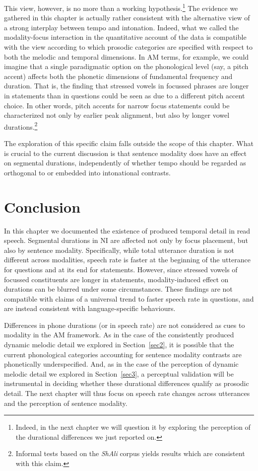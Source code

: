 This view, however, is no more than a working hypothesis.\footnote{Indeed, in the next chapter we will question it by exploring the perception of the durational differences we just reported on.} The evidence we gathered in this chapter is actually rather consistent with the alternative view of a strong interplay between tempo and intonation. Indeed, what we called the modality-focus interaction in the quantitative account of the data is compatible with the view according to which prosodic categories are specified with respect to both the melodic and temporal dimensions. In AM terms, for example, we could imagine that a single paradigmatic option on the phonological level (say, a pitch accent) affects both the phonetic dimensions of fundamental frequency and duration. That is, the finding that stressed vowels in focussed phrases are longer in statements than in questions could be seen as due to a different pitch accent choice. In other words, pitch accents for narrow focus statements could be characterized not only by earlier peak alignment, but also by longer vowel durations.\footnote{Informal tests based on the \textit{ShAli} corpus \citep{niebuhr2011shapers} yields results which are consistent with this claim.} 

The exploration of this specific claim falls outside the scope of this chapter. What is crucial to the current discussion is that sentence modality does have an effect on segmental durations, independently of whether tempo should be regarded as orthogonal to or embedded into intonational contrasts. 

\section{Conclusion}\label{sec46}
In this chapter we documented the existence of produced temporal detail in read speech. Segmental durations in NI are affected not only by focus placement, but also by sentence modality. Specifically, while total utterance duration is not different across modalities, speech rate is faster at the beginning of the utterance for questions and at its end for statements. However, since stressed vowels of focussed constituents are longer in statements, modality-induced effect on durations can be blurred under some circumstances. These findings are not compatible with claims of a universal trend to faster speech rate in questions, and are instead consistent with language-specific behaviours. 

Differences in phone durations (or in speech rate) are not considered as cues to modality in the AM framework. As in the case of the consistently produced dynamic melodic detail we explored in Section~\ref{sec2}, it is possible that the current phonological categories accounting for sentence modality contrasts are phonetically underspecified. And, as in the case of the perception of dynamic melodic detail we explored in Section~\ref{sec3}, a perceptual validation will be instrumental in deciding whether these durational differences qualify as prosodic detail. The next chapter will thus focus on speech rate changes across utterances and the perception of sentence modality.

